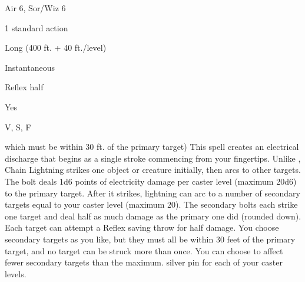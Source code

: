 
\begin{description*}
\item[Level:] Air 6, Sor/Wiz 6
\item[Casting Time:] 1 standard action
\item[Range:] Long (400 ft. + 40 ft./level)
\item[Duration:] Instantaneous
\item[Saving Throw:] Reflex half
\item[Spell Resistance:] Yes
\item[Components:] V, S, F
\end{description*}

which must be within 30 ft. of the primary target)
This spell creates an electrical discharge that begins as a single stroke commencing
from your fingertips. Unlike , Chain Lightning strikes
one object or creature initially, then arcs to other targets.
The bolt deals 1d6 points of electricity damage per caster level (maximum 20d6)
to the primary target. After it strikes, lightning can arc to a number of secondary
targets equal to your caster level (maximum 20). The secondary bolts each strike
one target and deal half as much damage as the primary one did (rounded down).
Each target can attempt a Reflex saving throw for half damage. You choose secondary
targets as you like, but they must all be within 30 feet of the primary target,
and no target can be struck more than once. You can choose to affect fewer secondary
targets than the maximum.
silver pin for each of your caster levels.